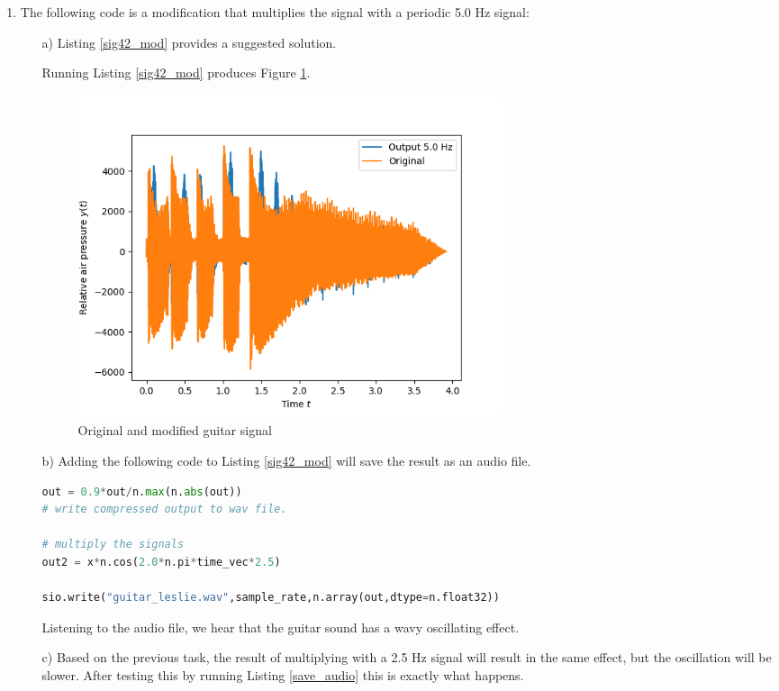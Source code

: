 \begin{enumerate}
\item The following code is a modification that multiplies the signal with a periodic 5.0 Hz signal:
\begin{itemize}
\item[a)] Listing \ref{sig42_mod} provides a suggested solution.

Running Listing \ref{sig42_mod} produces Figure \ref{fig:ex6b}.
\begin{figure}[h!]
    \centering
    \includegraphics[width=12.5cm,height=9.5cm]{ch06/figures/ex6b.png}
    \caption{Original and modified guitar signal}
    \label{fig:ex6b}
\end{figure}

\item[b)]
Adding the following code to Listing \ref{sig42_mod} will save the result as an audio file.
\begin{lstlisting}[language=Python,caption=Saving an audiofile,label=save_audio]
out = 0.9*out/n.max(n.abs(out)) 
# write compressed output to wav file.

# multiply the signals
out2 = x*n.cos(2.0*n.pi*time_vec*2.5)

sio.write("guitar_leslie.wav",sample_rate,n.array(out,dtype=n.float32))
\end{lstlisting}
Listening to the audio file, we hear that the guitar sound has a wavy oscillating effect.

\item[c)]
Based on the previous task, the result of multiplying with a 2.5 Hz signal will result in the same effect, but the oscillation will be slower. 
After testing this by running Listing \ref{save_audio} this is exactly what happens. 
\end{itemize}




\end{enumerate}
